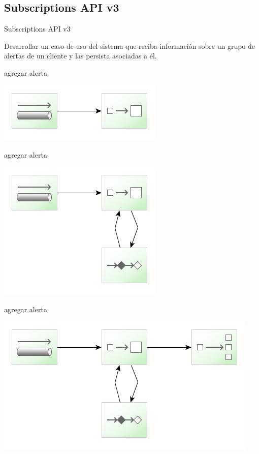 \documentclass{beamer}
\begin{document}
\subsection{Subscriptions API v3}
\begin{frame}
\begin{center}
\Large{Subscriptions API v3}
\end{center}
Desarrollar un caso de uso del sistema que reciba información sobre un grupo de alertas de un cliente y las persista asociadas a él.
\end{frame}

\begin{frame}{agregar alerta}
\begin{center}
\includegraphics[width=0.4\linewidth]{sp-int-25}
\end{center}
\end{frame}

\begin{frame}{agregar alerta}
\begin{center}
\includegraphics[width=0.4\linewidth]{sp-int-26}
\end{center}
\end{frame}

\begin{frame}{agregar alerta}
\begin{center}
\includegraphics[width=0.6\linewidth]{sp-int-27}
\end{center}
\end{frame}
\end{document}
